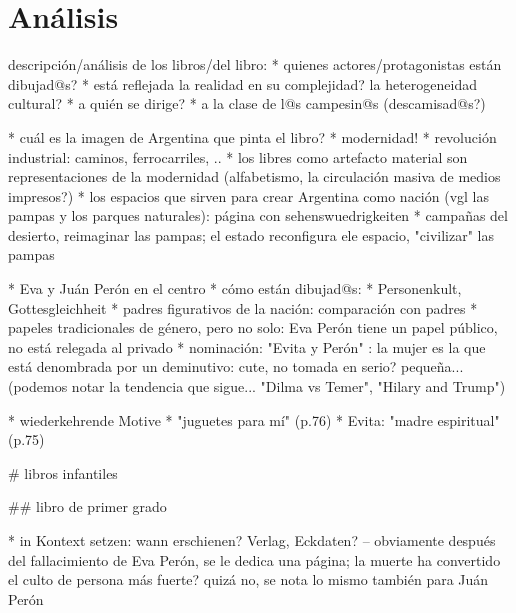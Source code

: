 \section{Análisis}

descripción/análisis de los libros/del libro:
* quienes actores/protagonistas están dibujad@s?
  * está reflejada la realidad en su complejidad? la heterogeneidad cultural?
* a quién se dirige?
  * a la clase de l@s campesin@s (descamisad@s?)

* cuál es la imagen de Argentina que pinta el libro?
  * modernidad!
    * revolución industrial: caminos, ferrocarriles, ..
    * los libres como artefacto material son representaciones de la modernidad (alfabetismo, la circulación masiva de medios impresos?)
  * los espacios que sirven para crear Argentina como nación (vgl las pampas y los parques naturales): página con sehenswuedrigkeiten
    * campañas del desierto, reimaginar las pampas; el estado reconfigura ele espacio, "civilizar" las pampas

* Eva y Juán Perón en el centro
  * cómo están dibujad@s:
    * Personenkult, Gottesgleichheit
    * padres figurativos de la nación: comparación con padres
    * papeles tradicionales de género, pero no solo: Eva Perón tiene un papel público, no está relegada al privado
  * nominación: "Evita y Perón" : la mujer es la que está denombrada por un deminutivo: cute, no tomada en serio? pequeña... (podemos notar la tendencia que sigue... "Dilma vs Temer", "Hilary and Trump")

* wiederkehrende Motive
  * "juguetes para mí" (p.76)
  * Evita: "madre espiritual" (p.75)



# libros infantiles

## libro de primer grado

* in Kontext setzen: wann erschienen? Verlag, Eckdaten? -- obviamente después del fallacimiento de Eva Perón, se le dedica una página; la muerte ha convertido el culto de persona más fuerte? quizá no, se nota lo mismo también para Juán Perón

